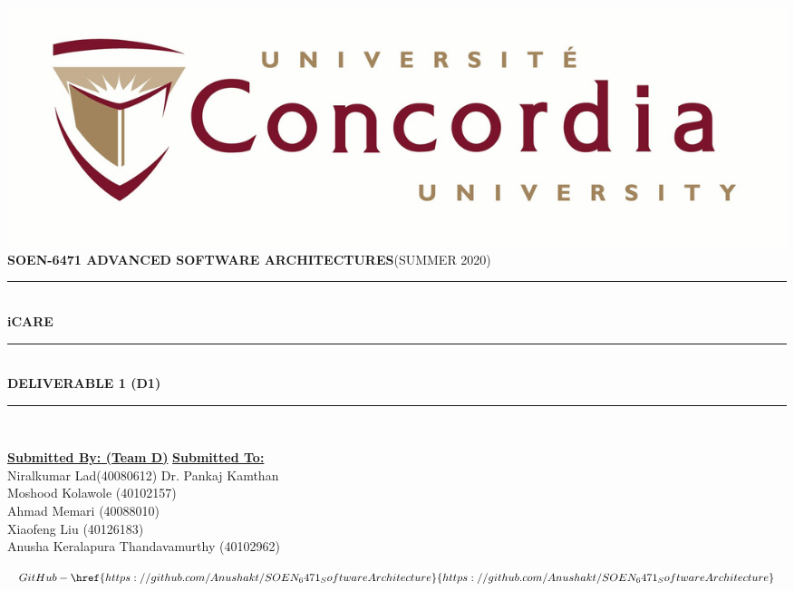 \documentclass[a4paper,12pt]{report}
\newcommand{\TermName}{SUMMER 2020}
\newcommand{\Course}{\textbf{SOEN-6471 \vspace{0.5cm} ADVANCED SOFTWARE ARCHITECTURES}}
\begin{document}
\begin{titlepage}

\newcommand{\HRule}{\rule{\linewidth}{0.5mm}} 

\centering
\textbf{\LARGE  } \\ [5mm] 
\includegraphics[scale=.2]{University_logo.jpg}\\[1cm] 
\textsc{\Large \Course (\TermName)} \\  [0.5cm]

	
\HRule \\[0.6cm]
{ \huge \bfseries iCARE}\\[0.4cm] 
\HRule \\[0.5cm]

{\large \textbf{DELIVERABLE 1 (D1)} }	

\HRule \\[1.5cm]

\vspace{3cm}

\begin{flushleft}


\textbf{\underline{\Large Submitted By: (Team D)}}
\hfill
\textbf{\underline{\Large Submitted To:}} \\
\vspace{3mm}
\large Niralkumar Lad(40080612)
\hfill
\large Dr. Pankaj Kamthan \\
\large Moshood Kolawole (40102157) \hfill \\
\large Ahmad Memari (40088010) \hfill \\
\large Xiaofeng Liu (40126183) \hfill \\
\large Anusha Keralapura Thandavamurthy (40102962) \\

\end{flushleft}

\centering \vspace{1cm}

$GitHub - \href{https://github.com/Anushakt/SOEN_6471_SoftwareArchitecture}{https://github.com/Anushakt/SOEN_6471_SoftwareArchitecture}$

\vfill
\end{titlepage}
\end{document}
